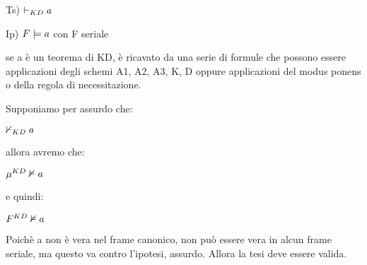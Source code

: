 Ts) $\vdash_{KD}a$

Ip) $F\models a$ con F seriale

se a è un teorema di KD, è ricavato da una serie di formule che possono
essere applicazioni degli schemi A1, A2, A3, K, D oppure applicazioni
del modus ponens o della regola di necessitazione.

Supponiamo per assurdo che:

$\nvdash_{KD}a$

allora avremo che:

$\mu^{KD}\nvDash a$

e quindi:

$F^{KD}\nvDash a$

Poichè a non è vera nel frame canonico, non può essere vera in alcun
frame seriale, ma questo va contro l'ipotesi, assurdo. Allora la tesi
deve essere valida.


